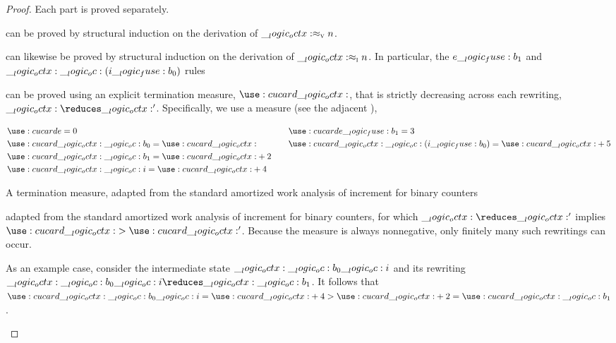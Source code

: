 \begin{proof}
  Each part is proved separately.
  \begin{description}[
    parsep=0pt, listparindent=\parindent,
    labelsep=0.35em
  ]
  \item[Value soundness]
    can be proved by structural induction on the derivation of $\__logic_octx: \approx\sb{\text{\normalfont\scshape v}} n$.
  \item[Preservation and progress]
    can likewise be proved by structural induction on the derivation of $\__logic_octx: \approx\sb{\text{\normalfont\scshape i}} n$.
    In particular, the $e \__logic_fuse: b_1$ and $\__logic_octx: \__logic_oc: (i \__logic_fuse: b_0)$ rules
  \item[Termination]
    can be proved using an explicit termination measure, $\card{\octx}$, that is strictly decreasing across each rewriting, $\octx \reduces \octx'$.
    Specifically, we use a measure (see the adjacent ),
    \begin{marginfigure}
      \begin{equation*}
        \begin{lgathered}[t]
          \card{e} = 0 \\
          \card{\octx \oc b_0} = \card{\octx} \\
          \card{\octx \oc b_1} = \card{\octx} + 2 \\
          \card{\octx \oc i} = \card{\octx} + 4
        \end{lgathered}
        \qquad
        \begin{lgathered}[t]
          \card{e \fuse b_1} = 3 \\
          \card{\octx \oc (i \fuse b_0)} = \card{\octx} + 5
        \end{lgathered}
      \end{equation*}
      \caption{A termination measure, adapted from the standard amortized work analysis of increment for binary counters}\label{fig:ordered-rewriting:binary-counter:measure}
    \end{marginfigure}%
    adapted from the standard amortized work analysis of increment for binary counters\autocite{??}, for which $\octx \reduces \octx'$ implies $\card{\octx} > \card{\octx'}$.
    Because the measure is always nonnegative, only finitely many such rewritings can occur.

    As an example case, consider the intermediate state $\__logic_octx: \__logic_oc: b_0 \__logic_oc: i$ and its rewriting $\octx \oc b_0 \oc i \reduces \octx \oc b_1$.
    It follows that $\card{\octx \oc b_0 \oc i} = \card{\octx} + 4 > \card{\octx} + 2 = \card{\octx \oc b_1}$.
  \qedhere
  \end{description}
\end{proof}

